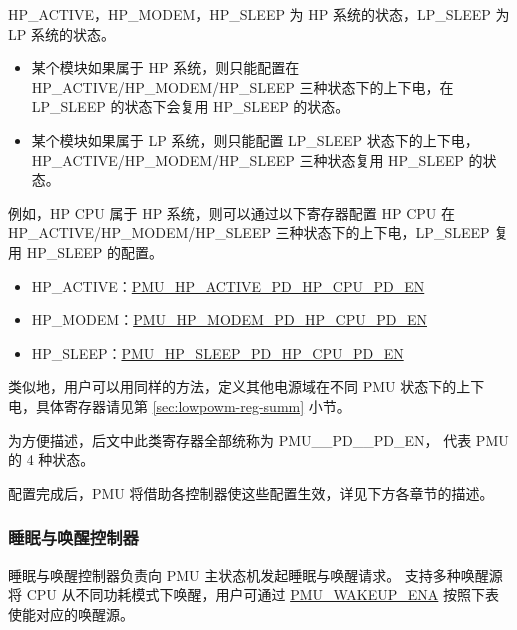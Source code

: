 \documentclass[main\_\_CN.tex]{subfiles}
\begin{document}
HP\_ACTIVE，HP\_MODEM，HP\_SLEEP 为 HP 系统的状态，LP\_SLEEP 为 LP 系统的状态。
\begin{itemize}
    \item 某个模块如果属于 HP 系统，则只能配置在 HP\_ACTIVE/HP\_MODEM/HP\_SLEEP 三种状态下的上下电，在 LP\_SLEEP 的状态下会复用 HP\_SLEEP 的状态。
    \item 某个模块如果属于 LP 系统，则只能配置 LP\_SLEEP 状态下的上下电，HP\_ACTIVE/HP\_MODEM/HP\_SLEEP 三种状态复用 HP\_SLEEP 的状态。
\end{itemize}

例如，HP CPU 属于 HP 系统，则可以通过以下寄存器配置 HP CPU 在 HP\_ACTIVE/HP\_MODEM/HP\_SLEEP 三种状态下的上下电，LP\_SLEEP 复用 HP\_SLEEP 的配置。

\begin{itemize}
    \item HP\_ACTIVE：\hyperref[fielddesc:PMUHPACTIVEPDHPCPUPDEN]{PMU\_HP\_ACTIVE\_PD\_HP\_CPU\_PD\_EN}
    \item HP\_MODEM：\hyperref[fielddesc:PMUHPMODEMPDHPCPUPDEN]{PMU\_HP\_MODEM\_PD\_HP\_CPU\_PD\_EN}
    \item HP\_SLEEP：\hyperref[fielddesc:PMUHPSLEEPPDHPCPUPDEN]{PMU\_HP\_SLEEP\_PD\_HP\_CPU\_PD\_EN}
\end{itemize}

类似地，用户可以用同样的方法，定义其他电源域在不同 PMU 状态下的上下电，具体寄存器请见第 \ref{sec:lowpowm-reg-summ} 小节。

\begin{tiplisting}
为方便描述，后文中此类寄存器全部统称为 PMU\_\_PD\_\_PD\_EN， 代表 PMU 的 4 种状态。
\end{tiplisting}

配置完成后，PMU 将借助各控制器使这些配置生效，详见下方各章节的描述。

\subsubsection{睡眠与唤醒控制器}

睡眠与唤醒控制器负责向 PMU 主状态机发起睡眠与唤醒请求。\chipname{} 支持多种唤醒源将 CPU 从不同功耗模式下唤醒，用户可通过 \hyperref[fielddesc:PMUWAKEUPENA]{PMU\_WAKEUP\_ENA} 按照下表使能对应的唤醒源。
\end{document}
